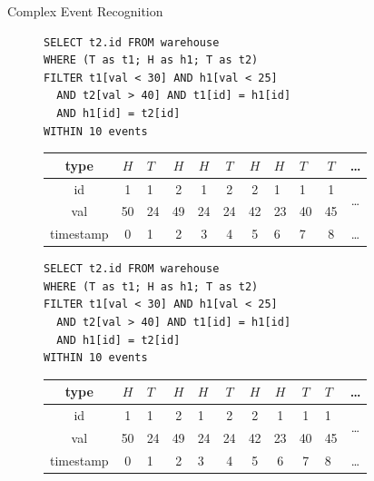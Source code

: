 \documentclass[xcolor=pdftex,dvipsnames,table]{beamer}
\begin{document}
\begin{frame}{Complex Event Recognition}
 \framebreak

 \begin{block}{}
    \begin{figure}[H]
      \begin{verbatim}
SELECT t2.id FROM warehouse
WHERE (T as t1; H as h1; T as t2)
FILTER t1[val < 30] AND h1[val < 25]
  AND t2[val > 40] AND t1[id] = h1[id]
  AND h1[id] = t2[id]
WITHIN 10 events
      \end{verbatim}
    \end{figure}
    \begin{figure}[H]
      \centering
      \begin{tabular}{|c|c|a|c|c|c|c|a|a|c|c}\hline
        type  &$H$&$T$&$H$&$H$&$T$&$H$&$H$&$T$&$T$ & \ldots \\ \hline
        id  & 1 & 1 & 2 & 1 & 2 & 2 & 1 & 1 & 1 &  \\
        val & 50 & 24& 49& 24& 24& 42& 23& 40& 45\\ \hline
        timestamp & 0 & 1 & 2 & 3 & 4 & 5 & 6 & 7 & 8 & \ldots \\ \hline
      \end{tabular}
    \end{figure}
 \end{block}

 \framebreak

 \begin{block}{}
    \begin{figure}[H]
      \begin{verbatim}
SELECT t2.id FROM warehouse
WHERE (T as t1; H as h1; T as t2)
FILTER t1[val < 30] AND h1[val < 25]
  AND t2[val > 40] AND t1[id] = h1[id]
  AND h1[id] = t2[id]
WITHIN 10 events
      \end{verbatim}
    \end{figure}
    \begin{figure}[H]
      \centering
      \begin{tabular}{|c|c|a|c|a|c|c|c|c|a|c}\hline
        type  &$H$&$T$&$H$&$H$&$T$&$H$&$H$&$T$&$T$ & \ldots \\ \hline
        id  & 1 & 1 & 2 & 1 & 2 & 2 & 1 & 1 & 1 &  \\
        val & 50 & 24& 49& 24& 24& 42& 23& 40& 45\\ \hline
        timestamp & 0 & 1 & 2 & 3 & 4 & 5 & 6 & 7 & 8 & \ldots \\ \hline
      \end{tabular}
    \end{figure}
 \end{block}


\end{frame}
\end{document}
